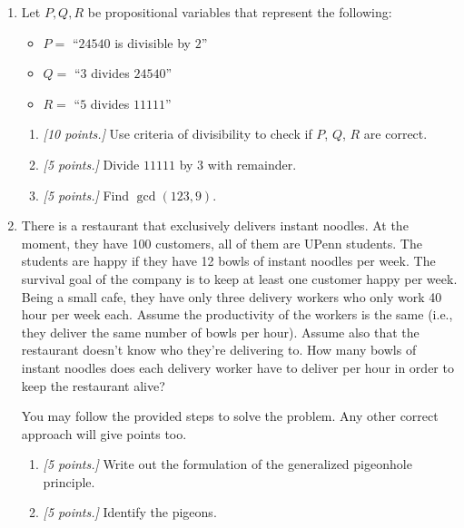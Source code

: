 \documentclass[12pt]{amsart}
\begin{document}
\begin{enumerate}[label=\arabic*.,itemsep=10pt, leftmargin=*]
    \item 
        Let $P,Q,R$ be propositional variables
        that represent the following:
        \begin{itemize}
            \item $P=$ ``$24540$ is divisible by $2$''
            \item $Q =$ ``$3$ divides $24540$''
            \item $R=$ ``$5$ divides $11111$''
        \end{itemize}
            
        \begin{enumerate}
        \item
        \textit{[10 points.]}
        Use criteria of divisibility to check if $P$, $Q$, $R$ are correct.
        \item
        \textit{[5 points.]}
        Divide $11111$ by $3$ with remainder.
        \item
        \textit{[5 points.]}
        Find $\gcd(123,9)$.
        \end{enumerate}

    \item 
        There is a restaurant that exclusively delivers instant noodles.
        At the moment, they have 100 customers, all of them are UPenn students.
        The students are happy if they have 12 bowls of instant noodles per week.
        The survival goal of the company is to keep at least one customer happy per week.
        Being a small cafe, they have only three delivery workers who only work 40 hour per week each.
        Assume the productivity of the workers is the same (i.e., they deliver the same number of bowls per hour).
        Assume also that the restaurant doesn't know who they're delivering to.
        How many bowls of instant noodles does each delivery worker have to deliver per hour
        in order to keep the restaurant alive? 
        

        You may follow the provided steps to solve the problem. Any other correct approach will give points too.
        
        \begin{enumerate}
            \item
        \textit{[5 points.]}
            Write out the formulation of the generalized pigeonhole principle.
        
            \item 
        \textit{[5 points.]}
            Identify the pigeons.


\end{enumerate}
\end{enumerate}
\end{document}
